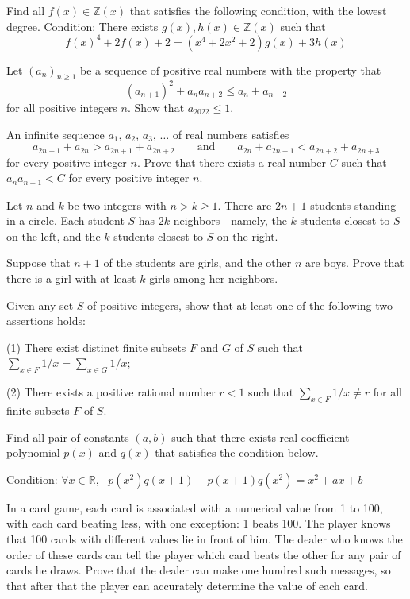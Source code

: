 \documentclass[11pt]{scrartcl}
\begin{document}
\begin{problem}[5790808043328490922]
Find all $f(x)\in \mathbb Z (x)$ that satisfies the following condition, with the lowest degree.
Condition: There exists $g(x),h(x)\in \mathbb Z (x)$ such that$$f(x)^4+2f(x)+2=(x^4+2x^2+2)g(x)+3h(x)$$
\end{problem}
\begin{problem}[633974672407561]
Let $(a_n)_{n\geq 1}$ be a sequence of positive real numbers with the property that
$$(a_{n+1})^2 + a_na_{n+2} \leq a_n + a_{n+2}$$for all positive integers $n$. Show that $a_{2022}\leq 1$.
\end{problem}
\begin{problem}[8126547357118301633]
An infinite sequence $a_1$, $a_2$, $a_3$, $\ldots$ of real numbers satisfies
\[
a_{2n-1} + a_{2n} > a_{2n+1} + a_{2n+2} \qquad \mbox{and} \qquad a_{2n} + a_{2n+1} < a_{2n+2} + a_{2n+3}
\]for every positive integer $n$. Prove that there exists a real number $C$ such that $a_{n} a_{n+1} < C$ for every positive integer $n$.
\end{problem}
\begin{problem}[3866807698726339637]
Let $n$ and $k$ be two integers with $n>k\geqslant 1$. There are $2n+1$ students standing in a circle. Each student $S$ has $2k$ neighbors - namely, the $k$ students closest to $S$ on the left, and the $k$ students closest to $S$ on the right.

Suppose that $n+1$ of the students are girls, and the other $n$ are boys. Prove that there is a girl with at least $k$ girls among her neighbors.
\end{problem}
\begin{problem}[120381541018683]
Given any set $S$ of positive integers, show that at least one of the following two assertions holds:

(1) There exist distinct finite subsets $F$ and $G$ of $S$ such that $\sum_{x\in F}1/x=\sum_{x\in G}1/x$;

(2) There exists a positive rational number $r<1$ such that $\sum_{x\in F}1/x\neq r$ for all finite subsets $F$ of $S$.
\end{problem}
\begin{problem}[3232480961068145020]
Find all pair of constants $(a,b)$ such that there exists real-coefficient polynomial $p(x)$ and $q(x)$ that satisfies the condition below.

Condition: $\forall x\in \mathbb R,$ $ $ $p(x^2)q(x+1)-p(x+1)q(x^2)=x^2+ax+b$
\end{problem}
\begin{problem}[4059278924956282558]
In a card game, each card is associated with a numerical value from 1 to 100, with each card beating less, with one exception: 1 beats 100. The player knows that 100 cards with different values lie in front of him. The dealer who knows the order of these cards can tell the player which card beats the other for any pair of cards he draws. Prove that the dealer can make one hundred such messages, so that after that the player can accurately determine the value of each card.
\end{problem}
\end{document}
